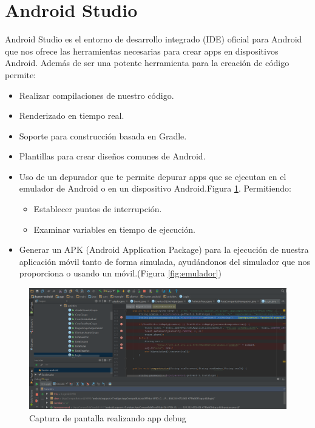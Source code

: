 \section{Android Studio}
Android Studio es el entorno de desarrollo integrado (IDE)  oficial para Android que nos ofrece las herramientas necesarias para crear apps en  dispositivos Android.
Además de ser una potente herramienta para la creación de código permite:

\begin{itemize}
\item Realizar compilaciones  de nuestro código.
\item Renderizado en tiempo real.
\item Soporte para construcción basada en Gradle.
\item Plantillas para crear diseños comunes de Android.
\item Uso de un depurador que te permite depurar apps que se ejecutan en el emulador de Android o en un dispositivo Android.Figura \ref{fig:debug}. Permitiendo:\begin{itemize}
\item Establecer puntos de interrupción.
\item Examinar variables en tiempo de ejecución.
\end{itemize}


\item Generar un APK (Android Application Package) para la ejecución de nuestra aplicación móvil tanto de forma simulada, ayudándonos del simulador que nos proporciona o usando un móvil.(Figura \ref{fig:emulador})
\end{itemize}
\begin{figure}
		\centering
		\includegraphics[width=\textwidth] {debug.png}
		\caption{Captura de pantalla realizando app debug }\label{fig:debug}
	\end{figure}
